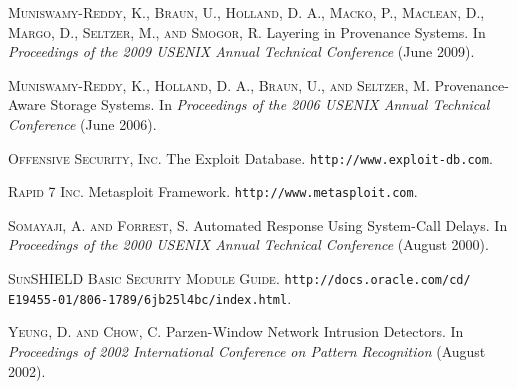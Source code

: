 \documentclass[10pt,twocolumn]{article}
\begin{document}
\begin{thebibliography}{99}
\textsc{Muniswamy-Reddy, K., Braun, U., Holland, D. A., Macko, P., Maclean, D., Margo, D., Seltzer, M., and Smogor, R.} Layering in Provenance Systems. In {\em Proceedings of the 2009 USENIX Annual Technical Conference} (June 2009).

\textsc{Muniswamy-Reddy, K., Holland, D. A., Braun, U., and Seltzer, M.} Provenance-Aware Storage Systems. In {\em Proceedings of the 2006 USENIX Annual Technical Conference} (June 2006).

\textsc{Offensive Security, Inc.} The Exploit Database. {\tt http://www.exploit-db.com}.

\textsc{Rapid 7 Inc.} Metasploit Framework. {\tt http://www.metasploit.com}.

\textsc{Somayaji, A. and Forrest, S.} Automated Response Using System-Call Delays. In {\em Proceedings of the 2000 USENIX Annual Technical Conference} (August 2000).

\textsc{SunSHIELD Basic Security Module Guide.} {\tt http://docs.oracle.com/cd/\\E19455-01/806-1789/6jb25l4bc/index.html}.

\textsc{Yeung, D. and Chow, C.} Parzen-Window Network Intrusion Detectors. In {\em Proceedings of 2002 International Conference on Pattern Recognition} (August 2002).

\end{thebibliography}
\end{document}

